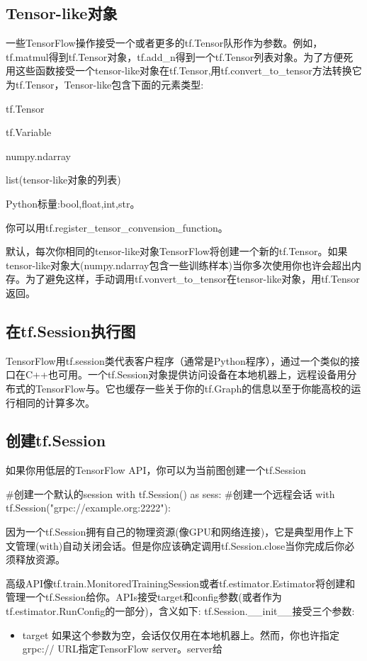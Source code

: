 \subsection{Tensor-like对象}
一些TensorFlow操作接受一个或者更多的tf.Tensor队形作为参数。例如，tf.matmul得到tf.Tensor对象，tf.add\_n得到一个tf.Tensor列表对象。为了方便死用这些函数接受一个tensor-like对象在tf.Tensor,用tf.convert\_to\_tensor方法转换它为tf.Tensor，Tensor-like包含下面的元素类型:
\begin{python}
\item tf.Tensor
\item tf.Variable
\item numpy.ndarray
\item list(tensor-like对象的列表)
\item Python标量:bool,float,int,str。
\end{python}
你可以用tf.register\_tensor\_convension\_function。

默认，每次你相同的tensor-like对象TensorFlow将创建一个新的tf.Tensor。如果tensor-like对象大(numpy.ndarray包含一些训练样本)当你多次使用你也许会超出内存。为了避免这样，手动调用tf.vonvert\_to\_tensor在tensor-like对象，用tf.Tensor返回。
\subsection{在tf.Session执行图}
TensorFlow用tf.session类代表客户程序（通常是Python程序），通过一个类似的接口在C++也可用。一个tf.Session对象提供访问设备在本地机器上，远程设备用分布式的TensorFlow与。它也缓存一些关于你的tf.Graph的信息以至于你能高校的运行相同的计算多次。
\subsection{创建tf.Session}
如果你用低层的TensorFlow API，你可以为当前图创建一个tf.Session
\begin{python}
#创建一个默认的session
with tf.Session() as sess:
#创建一个远程会话
with tf.Session("grpc://example.org:2222"):
\end{python}
因为一个tf.Session拥有自己的物理资源(像GPU和网络连接)，它是典型用作上下文管理(with)自动关闭会话。但是你应该确定调用tf.Session.close当你完成后你必须释放资源。

高级API像tf.train.MonitoredTrainingSession或者tf.estimator.Estimator将创建和管理一个tf.Session给你。APIs接受target和config参数(或者作为tf.estimator.RunConfig的一部分)，含义如下:
tf.Session.\_\_init\_\_接受三个参数:
\begin{itemize}
	\item target 如果这个参数为空，会话仅仅用在本地机器上。然而，你也许指定grpc:// URL指定TensorFlow server。server给
\end{itemize}
